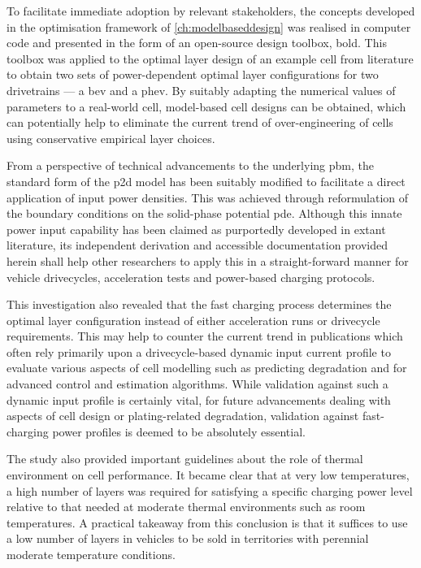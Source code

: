To  facilitate  immediate  adoption   by  relevant  stakeholders,  the  concepts
developed  in  the  optimisation  framework  of  \cref{ch:modelbaseddesign}  was
realised in  computer code and  presented in the  form of an  open-source design
toolbox, \gls{bold}. This toolbox was applied  to the optimal layer design of an
example cell from literature to obtain two sets of power-dependent optimal layer
configurations for two drivetrains --- a \gls{bev} and a \gls{phev}. By suitably
adapting the  numerical values of  parameters to a real-world  cell, model-based
cell  designs can  be  obtained, which  can potentially  help  to eliminate  the
current trend  of over-engineering of  cells using conservative  empirical layer
choices.

From a  perspective of technical  advancements to the underlying  \gls{pbm}, the
standard form  of the \gls{p2d} model  has been suitably modified  to facilitate
a  direct  application of  input  power  densities.  This was  achieved  through
reformulation of the boundary conditions on the solid-phase potential \gls{pde}.
Although  this innate  power input  capability has  been claimed  as purportedly
developed  in  extant  literature,  its independent  derivation  and  accessible
documentation  provided herein  shall help  other researchers  to apply  this in
a  straight-forward  manner  for  vehicle drivecycles,  acceleration  tests  and
power-based charging protocols.

This investigation also  revealed that the fast charging  process determines the
optimal layer  configuration instead of  either acceleration runs  or drivecycle
requirements. This may  help to counter the current trend  in publications which
often rely  primarily upon a  drivecycle-based dynamic input current  profile to
evaluate various  aspects of cell  modelling such as predicting  degradation and
for advanced control and estimation  algorithms. While validation against such a
dynamic input profile  is certainly vital, for future  advancements dealing with
aspects  of  cell  design  or plating-related  degradation,  validation  against
fast-charging power profiles is deemed to be absolutely essential.

The  study  also  provided  important  guidelines  about  the  role  of  thermal
environment on cell performance. It became  clear that at very low temperatures,
a high  number of layers was  required for satisfying a  specific charging power
level relative  to that  needed at  moderate thermal  environments such  as room
temperatures. A practical  takeaway from this conclusion is that  it suffices to
use a low number of layers in  vehicles to be sold in territories with perennial
moderate temperature conditions.

